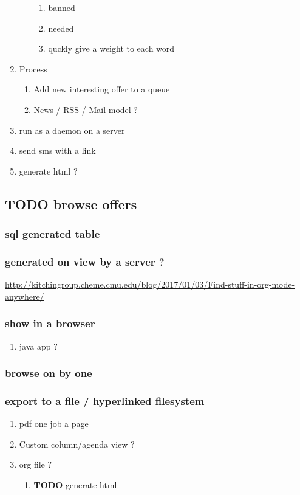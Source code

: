 \documentclass[11pt]{article}
\begin{document}
\begin{enumerate}
\begin{enumerate}
\begin{enumerate}
\item banned
\label{sec:org82572a6}
\item needed
\label{sec:org0c23b61}
\item quckly give a weight to each word
\label{sec:orgf1ef9f5}
\end{enumerate}
\end{enumerate}
\item Process
\label{sec:orgeba6c2d}
\begin{enumerate}
\item Add new interesting offer to a queue
\label{sec:org9f15263}
\item News / RSS / Mail model ?
\label{sec:org2c1cc00}
\end{enumerate}
\item run as a daemon on a server
\label{sec:org4820921}
\item send sms with a link
\label{sec:orgd0f07cb}
\item generate html ?
\label{sec:org02747bc}
\end{enumerate}
\subsection{{\bfseries\sffamily TODO} browse offers}
\label{sec:org839d31c}
\subsubsection{sql generated table}
\label{sec:org61df842}
\subsubsection{generated on view by a server ?}
\label{sec:org55f0715}
\url{http://kitchingroup.cheme.cmu.edu/blog/2017/01/03/Find-stuff-in-org-mode-anywhere/}
\subsubsection{show in a browser}
\label{sec:org386c026}
\begin{enumerate}
\item java app ?
\label{sec:org817238c}
\end{enumerate}
\subsubsection{browse on by one}
\label{sec:org149e685}
\subsubsection{export to a file / hyperlinked filesystem}
\label{sec:orgaf9f5aa}
\begin{enumerate}
\item pdf one job a page
\label{sec:org5776b44}
\item Custom column/agenda view ?
\label{sec:org9e741fc}
\item org file ?
\label{sec:org81c1f4c}
\begin{enumerate}
\item {\bfseries\sffamily TODO} generate html
\label{sec:org8178126}
\end{enumerate}
\end{enumerate}
\end{document}
